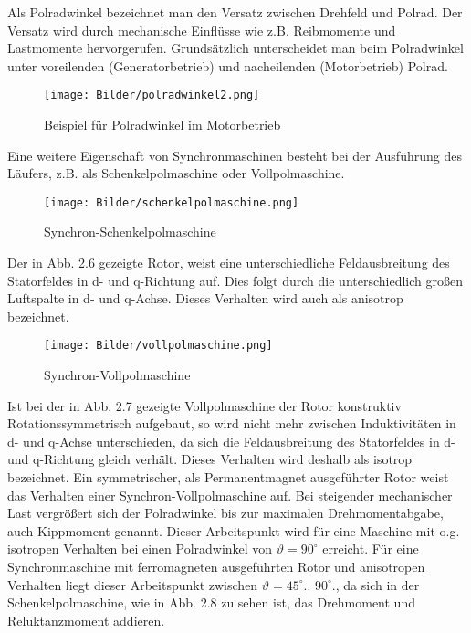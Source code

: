 Als Polradwinkel bezeichnet man den Versatz zwischen Drehfeld und Polrad. Der Versatz wird durch mechanische Einflüsse wie z.B. Reibmomente und Lastmomente hervorgerufen. Grundsätzlich unterscheidet man beim Polradwinkel unter voreilenden (Generatorbetrieb) und nacheilenden (Motorbetrieb) Polrad.\cite{schroeder}

\begin{figure}[H]
	\centering
	\texttt{[image: Bilder/polradwinkel2.png]} %
	\caption{Beispiel für Polradwinkel im Motorbetrieb \cite{elektronikkurs}\\}
	\label{fig: Beispiele für Polradwinkel}
\end{figure}


Eine weitere Eigenschaft von Synchronmaschinen besteht bei der Ausführung des Läufers, z.B. als Schenkelpolmaschine oder Vollpolmaschine.\cite{schroeder,binder}

\begin{figure}[H]
	\centering
	\texttt{[image: Bilder/schenkelpolmaschine.png]} %
	\caption{Synchron-Schenkelpolmaschine \cite{schroeder}\\}
	\label{fig: Synchron-Schenkelpolmaschine }
\end{figure}

Der in Abb. 2.6 gezeigte Rotor, weist eine unterschiedliche Feldausbreitung des Statorfeldes in d- und q-Richtung auf. Dies folgt durch die unterschiedlich großen Luftspalte in d- und q-Achse. Dieses Verhalten wird auch als anisotrop
bezeichnet.\cite{schroeder,binder}

\begin{figure}[H]
	\centering
	\texttt{[image: Bilder/vollpolmaschine.png]} %
	\caption{Synchron-Vollpolmaschine \cite{schroeder}\\}
	\label{fig: Synchron-Vollpolmaschine }
\end{figure}

Ist bei der in Abb. 2.7 gezeigte Vollpolmaschine der Rotor konstruktiv Rotationssymmetrisch aufgebaut, so wird nicht mehr zwischen Induktivitäten in d- und q-Achse unterschieden, da sich die Feldausbreitung des Statorfeldes in d- und q-Richtung gleich verhält.\cite{schroeder} Dieses Verhalten wird deshalb als isotrop bezeichnet.\cite{binder} \newline
Ein symmetrischer, als Permanentmagnet ausgeführter Rotor weist das Verhalten einer Synchron-Vollpolmaschine auf.\cite{schroeder} \newline
 Bei steigender mechanischer Last vergrößert sich der Polradwinkel bis zur maximalen Drehmomentabgabe, auch Kippmoment genannt. Dieser Arbeitspunkt wird für eine Maschine mit o.g. isotropen Verhalten bei einen Polradwinkel von $\vartheta = 90^\circ$ erreicht.\cite{schroeder,binder} Für eine Synchronmaschine mit ferromagneten ausgeführten Rotor und anisotropen Verhalten liegt dieser Arbeitspunkt zwischen $\vartheta = 45^\circ$.. $90^\circ$.\cite{binder}, da sich in der Schenkelpolmaschine, wie in Abb. 2.8 zu sehen ist, das Drehmoment und Reluktanzmoment addieren.
 
